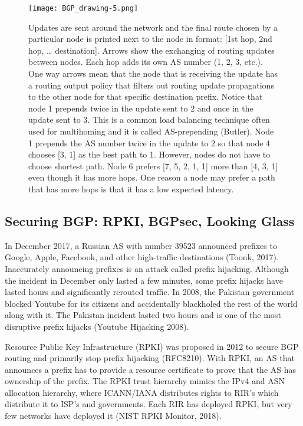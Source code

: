 \documentclass[letterpaper, 10 pt, conference]{ieeeconf}  %
\begin{document}
\begin{figure}[h!]
	\centering
	\texttt{[image: BGP\_drawing-5.png]}
\caption{Updates are sent around the network and the final route chosen by a particular node is printed next to the node in format: [1st hop, 2nd hop, … destination]. Arrows show the exchanging of routing updates between nodes. Each hop adds its own AS number (1, 2, 3, etc.). One way arrows mean that the node that is receiving the update has a routing output policy that filters out routing update propagations to the other node for that specific destination prefix. Notice that node 1 prepends twice in the update sent to 2 and once in the update sent to 3. This is a common load balancing technique often used for multihoming and it is called AS-prepending (Butler). Node 1 prepends the AS number twice in the update to 2 so that node 4 chooses [3, 1] as the best path to 1. However, nodes do not have to choose shortest path. Node 6 prefers [7, 5, 2, 1, 1] more than [4, 3, 1] even though it has more hops. One reason a node may prefer a path that has more hops is that it has a low expected latency. 
}
\end{figure}



\subsection{Securing BGP: RPKI, BGPsec, Looking Glass}

In December 2017, a Russian AS with number 39523 announced prefixes to Google, Apple, Facebook, and other high-traffic destinations (Toonk, 2017). Inaccurately announcing prefixes is an attack called prefix hijacking. Although the incident in December only lasted a few minutes, some prefix hijacks have lasted hours and significantly rerouted traffic. In 2008, the Pakistan government blocked Youtube for its citizens and accidentally blackholed the rest of the world along with it. The Pakistan incident lasted two hours and is one of the most disruptive prefix hijacks (Youtube
Hijacking 2008). 

Resource Public Key Infrastructure (RPKI) was proposed in 2012 to secure BGP routing and primarily stop prefix hijacking (RFC8210). With RPKI, an AS that announces a prefix has to provide a resource certificate to prove that the AS has ownership of the prefix. The RPKI trust hierarchy mimics the IPv4 and ASN allocation hierarchy, where ICANN/IANA distributes rights to RIR’s which distribute it to ISP’s and governments. Each RIR has deployed RPKI, but very few networks have deployed it (NIST RPKI Monitor, 2018).
\end{document}
